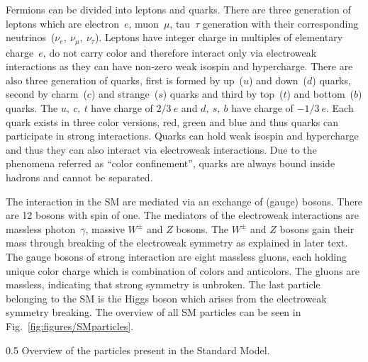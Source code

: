 Fermions can be divided into leptons and quarks. There are three generation of leptons which are electron~$e$, muon~$\mu$, tau~$\tau$ generation with their corresponding neutrinos~($\nu_{e},~\nu_{\mu},~\nu_{\tau}$). Leptons have integer charge in multiples of elementary charge~$e$, do not carry color and therefore interact only via electroweak interactions as they can have non-zero weak isospin and hypercharge. There are also three generation of quarks, first is formed by up~($u$) and down~($d$) quarks, second by charm~($c$) and strange~($s$) quarks and third by top~($t$) and bottom~($b$) quarks. The $u,~c,~t$ have charge of $2/3~e$ and $d,~s,~b$ have charge of $-1/3~e$. Each quark exists in three color versions, red, green and blue and thus quarks can participate in strong interactions. Quarks can hold weak isospin and hypercharge and thus they can also interact via electroweak interactions. Due to the phenomena referred as ``color confinement'', quarks are always bound inside hadrons and cannot be separated.

The interaction in the SM are mediated via an exchange of (gauge) bosons. There are 12 bosons with spin of one. The mediators of the electroweak interactions are massless photon~$\gamma$, massive $W^{\pm}$ and $Z$ bosons. The $W^{\pm}$ and $Z$ bosons gain their mass through breaking of the electroweak symmetry as explained in later text. The gauge bosons of strong interaction are eight massless gluons, each holding unique color charge which is combination of colors and anticolors. The gluons are massless, indicating that strong symmetry is unbroken. The last particle belonging to the SM is the Higgs boson which arises from the electroweak symmetry breaking. The overview of all SM particles can be seen in Fig.~\ref{fig:figures/SMparticles}.


                 {0.5}       %
                 { Overview of the particles present in the Standard Model.}



